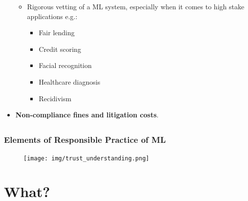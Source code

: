 \documentclass[11pt,
               		aspectratio=169,
               		hyperref={colorlinks}
               		]{beamer}
\begin{document}
\begin{frame}
\begin{itemize}
\begin{itemize}
\begin{itemize}
    				  \end{itemize}
            \item {Rigorous vetting of a ML system, especially when it comes to high stake applications e.g.:}
              \begin{itemize}
                \item \tiny{Fair lending}
                \item \tiny{Credit scoring}
                \item \tiny{Facial recognition}
                \item \tiny{Healthcare diagnosis}
                \item \tiny{Recidivism}
              \end{itemize}
          \end{itemize}
				\item \textbf{Non-compliance fines and litigation costs}.
  		\end{itemize}
		\end{frame}
		\subsection*{}
		\begin{frame}
			\frametitle{Elements of Responsible Practice of ML}
		  	\begin{figure}[htb]
    				\begin{center}
      					\texttt{[image: img/trust\_understanding.png]}
    				\end{center}
  			\end{figure}
		\end{frame}
	\section{What?}
\end{document}
